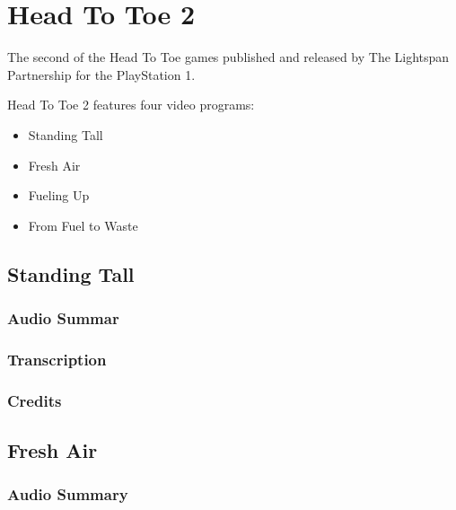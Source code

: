 \chapter{Head To Toe 2}


The second of the Head To Toe games published and released by The Lightspan Partnership for the PlayStation 1.

Head To Toe 2 features four video programs:

\begin{itemize}
    \item Standing Tall
    \item Fresh Air
    \item Fueling Up
    \item From Fuel to Waste
\end{itemize}

\clearpage
\newpage

\section{Standing Tall}

\subsection{Audio Summar}

\subsection{Transcription}

\subsection{Credits}

\section{Fresh Air}

\subsection{Audio Summary}

